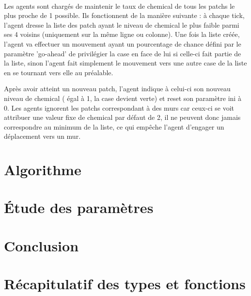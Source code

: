 \documentclass{article}
\begin{document}
\paragraph{}Les agents sont charg\'es de maintenir le taux de chemical de tous les patchs le plus proche de 1 possible.
Ils fonctionnent de la mani\`ere suivante : \`a chaque tick, l'agent dresse la liste des patch ayant le niveau de chemical le plus faible parmi ses 4 voisins (uniquement sur la m\^eme ligne ou colonne). Une fois la liste cr\'e\'ee, l'agent va effectuer un mouvement ayant un pourcentage de chance d\'efini par le param\`etre 'go-ahead' de privil\'egier la case en face de lui si celle-ci fait partie de la liste, sinon l'agent fait simplement le mouvement vers une autre case de la liste en se tournant vers elle au pr\'ealable.

Apr\`es avoir atteint un nouveau patch, l'agent indique \`a celui-ci son nouveau niveau de chemical ( \'egal \`a 1, la case devient verte) et reset son param\`etre ini \`a 0. Les agents ignorent les patchs correspondant \`a des murs car ceux-ci se voit attribuer une valeur fixe de chemical par d\'efaut de 2, il ne peuvent donc jamais correspondre au minimum de la liste, ce qui emp\^eche l'agent d'engager un d\'eplacement vers un mur.
\section{Algorithme}
    \subsection{}
\section{\'Etude des param\`etres}
    \subsection{}
\section{Conclusion}
    \subsection{}

\appendix
\newpage
\section{R\'ecapitulatif des types et fonctions}
\end{document}
